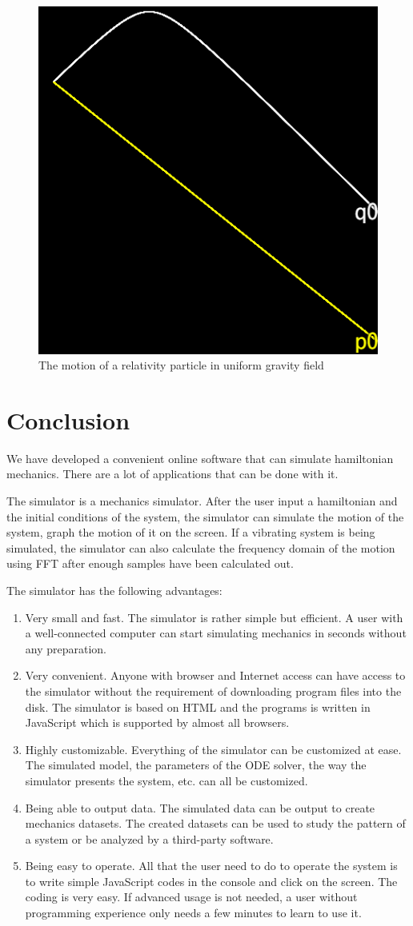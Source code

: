 \documentclass[12pt]{article}
\begin{document}
\begin{figure}[h]
  \centering
  \includegraphics[width=0.25\linewidth]{relativity_gravity.png}
  \caption{The motion of a relativity particle in uniform gravity field}
  \label{fig:relativity}
\end{figure}

\section{Conclusion}

We have developed a convenient online software that can simulate hamiltonian mechanics.
There are a lot of applications that can be done with it.

The simulator is a mechanics simulator.
After the user input a hamiltonian and the initial conditions of the system,
the simulator can simulate the motion of the system,
graph the motion of it on the screen.
If a vibrating system is being simulated,
the simulator can also calculate the frequency domain of the motion using FFT after enough samples have been calculated out.

The simulator has the following advantages:
\begin{enumerate}
  \item Very small and fast.
  The simulator is rather simple but efficient.
  A user with a well-connected computer can start simulating mechanics in seconds without any preparation.

  \item Very convenient.
  Anyone with browser and Internet access can have access to the simulator without the requirement of downloading program files into the disk.
  The simulator is based on HTML and the programs is written in JavaScript which is supported by almost all browsers.

  \item Highly customizable.
  Everything of the simulator can be customized at ease.
  The simulated model, the parameters of the ODE solver, the way the simulator presents the system, etc. can all be customized.

  \item Being able to output data.
  The simulated data can be output to create mechanics datasets.
  The created datasets can be used to study the pattern of a system or be analyzed by a third-party software.

  \item Being easy to operate.
  All that the user need to do to operate the system is to write simple JavaScript codes in the console and click on the screen.
  The coding is very easy.
  If advanced usage is not needed, a user without programming experience only needs a few minutes to learn to use it.
\end{enumerate}
\end{document}
